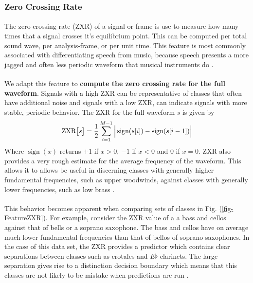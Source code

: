 \documentclass[12pt,letterpaper]{article}
\DeclareMathOperator{\sign}{\text{sign}}
\begin{document}

\subsubsection{Zero Crossing Rate}

\paragraph*{}The zero crossing rate (ZXR) of a signal or frame is use to measure how many times that a signal crosses it's equilibrium point. This can be computed per total sound wave, per analysis-frame, or per unit time. This feature is most commonly associated with differentiating speech from music, because speech presents a more jagged and often less periodic waveform that musical instruments do \cite{Khan,Liu,Zhang} . 

\paragraph*{}We adapt this feature to \textbf{compute the zero crossing rate for the full waveform}. Signals with a high ZXR can be representative of classes that often have additional noise and signals with a low ZXR, can indicate signals with more stable, periodic behavior. The ZXR for the full waveform $s$ is given by \cite{Serizel,Liu}
\begin{equation}
\label{eqn-ZXR}
\text{ZXR}\big[ s \big] = \frac{1}{2} \sum_{i=1}^{M-1} \Big{|} \sign(s[i]) - \sign(s[i-1]) \Big{|} 
\end{equation}
Where $\sign(x)$ returns $+1$ if $x > 0$, $-1$ if $x < 0$ and $0$ if $x = 0$. ZXR also provides a very rough estimate for the average frequency of the waveform. This allows it to allows be useful in discerning classes with generally higher fundamental frequencies, such as upper woodwinds, against classes with generally lower frequencies, such as low brass \cite{Liu,White}.

\paragraph*{}This behavior becomes apparent when comparing sets of classes in Fig. (\ref{fig-FeatureZXR}). For example, consider the ZXR value of a a bass and cellos against that of bells or a soprano saxophone. The bass and cellos have on average much lower fundamental frequencies than that of bellos of soprano saxophones. In the case of this data set, the ZXR provides a predictor which contains clear separations between classes such as crotales and $E\flat$ clarinets. The large separation gives rise to a distinction decision boundary which means that this classes are not likely to be mistake when predictions are run \cite{Loy,James}.
\end{document}
